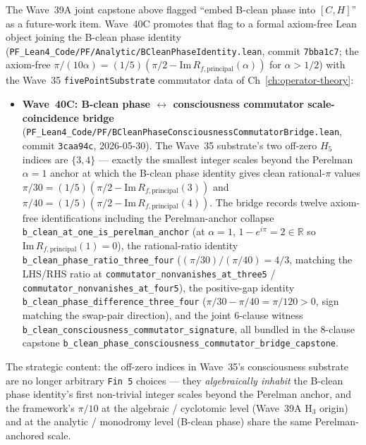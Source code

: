 \begin{remark}\label{rem:spectral-unity-wave40-lean}
The Wave~39A joint capstone above flagged ``embed B-clean phase into $[C, H]$'' as a future-work item. Wave~40C promotes that flag to a formal axiom-free Lean object joining the B-clean phase identity (\texttt{PF\_Lean4\_Code/PF/Analytic/BCleanPhaseIdentity.lean}, commit \texttt{7bba1c7}; the axiom-free $\pi/(10\alpha) = (1/5)(\pi/2 - \mathrm{Im}\, R_{f,\mathrm{principal}}(\alpha))$ for $\alpha > 1/2$) with the Wave~35 \texttt{fivePointSubstrate} commutator data of Ch~\ref{ch:operator-theory}:
\begin{itemize}
  \item \textbf{Wave~40C: B-clean phase $\leftrightarrow$ consciousness commutator scale-coincidence bridge} (\texttt{PF\_Lean4\_Code/PF/BCleanPhaseConsciousnessCommutatorBridge.lean}, commit \texttt{3caa94c}, 2026-05-30). The Wave~35 substrate's two off-zero $H_5$ indices are $\{3, 4\}$ --- exactly the smallest integer scales beyond the Perelman $\alpha = 1$ anchor at which the B-clean phase identity gives clean rational-$\pi$ values $\pi/30 = (1/5)(\pi/2 - \mathrm{Im}\, R_{f,\mathrm{principal}}(3))$ and $\pi/40 = (1/5)(\pi/2 - \mathrm{Im}\, R_{f,\mathrm{principal}}(4))$. The bridge records twelve axiom-free identifications including the Perelman-anchor collapse \texttt{b\_clean\_at\_one\_is\_perelman\_anchor} (at $\alpha = 1$, $1 - e^{i\pi} = 2 \in \mathbb{R}$ so $\mathrm{Im}\, R_{f,\mathrm{principal}}(1) = 0$), the rational-ratio identity \texttt{b\_clean\_phase\_ratio\_three\_four} ($(\pi/30)/(\pi/40) = 4/3$, matching the LHS/RHS ratio at \texttt{commutator\_nonvanishes\_at\_three5} / \texttt{commutator\_nonvanishes\_at\_four5}), the positive-gap identity \texttt{b\_clean\_phase\_difference\_three\_four} ($\pi/30 - \pi/40 = \pi/120 > 0$, sign matching the swap-pair direction), and the joint 6-clause witness \texttt{b\_clean\_consciousness\_commutator\_signature}, all bundled in the 8-clause capstone \texttt{b\_clean\_phase\_consciousness\_commutator\_bridge\_capstone}.
\end{itemize}
The strategic content: the off-zero indices in Wave~35's consciousness substrate are no longer arbitrary \texttt{Fin 5} choices --- they \emph{algebraically inhabit} the B-clean phase identity's first non-trivial integer scales beyond the Perelman anchor, and the framework's $\pi/10$ at the algebraic / cyclotomic level (Wave~39A H$_3$ origin) and at the analytic / monodromy level (B-clean phase) share the same Perelman-anchored scale.


\end{remark}

